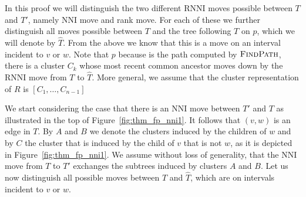 \documentclass{amsart}
\newcommand{\rnni}{\mathrm{RNNI}}
\newcommand{\findpath}{\textsc{FindPath}}
\newcommand{\nni}{\mathrm{NNI}}
\begin{document}
In this proof we will distinguish the two different $\rnni$ moves possible between $T$ and $T'$, namely $\nni$ move and rank move.
For each of these we further distinguish all moves possible between $T$ and the tree following $T$ on $p$, which we will denote by $\hat T$.
From the above we know that this is a move on an interval incident to $v$ or $w$.
Note that $p$ because is the path computed by $\findpath$, there is a cluster $C_k$ whose most recent common ancestor moves down by the $\rnni$ move from $T$ to $\hat T$.
More general, we assume that the cluster representation of $R$ is $[C_1, \ldots, C_{n-1}]$

We start considering the case that there is an $\nni$ move between $T'$ and $T$ as illustrated in the top of Figure~\ref{fig:thm_fp_nni1}.
It follows that $(v,w)$ is an edge in $T$.
By $A$ and $B$ we denote the clusters induced by the children of $w$ and by $C$ the cluster that is induced by the child of $v$ that is not $w$, as it is depicted in Figure~\ref{fig:thm_fp_nni1}.
We assume without loss of generality, that the $\nni$ move from $T$ to $T'$ exchanges the subtrees induced by clusters $A$ and $B$.
Let us now distinguish all possible moves between $T$ and $\hat T$, which are on intervals incident to $v$ or $w$.
\end{document}
